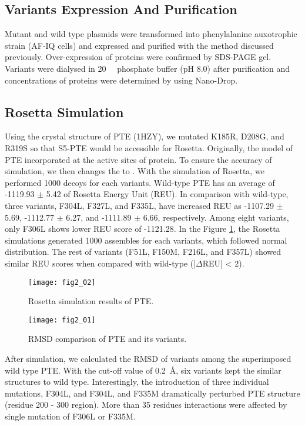 \begin{refsection}
\subsection{Variants Expression And Purification}

Mutant and wild type plasmids were transformed into 
phenylalanine auxotrophic strain (AF-IQ cells) and expressed and purified with
the method discussed  previously.\cite{Yang2014a} Over-expression of proteins
were confirmed by SDS-PAGE gel. Variants were dialysed in \SI{20}{\milli\Molar}
phosphate buffer (pH 8.0) after purification and concentrations of proteins
were determined by using Nano-Drop.

\subsection{Rosetta Simulation}

Using the crystal structure of PTE (1HZY), we mutated K185R, D208G, and R319S
so that S5-PTE would be accessible for Rosetta. Originally, the model of PTE
incorporated  at the active sites of protein. To ensure the accuracy
of simulation, we then changes the  to . With the
simulation of Rosetta, we performed 1000 decoys for each variants.  Wild-type
PTE has an average of -1119.93 $\pm$ 5.42 of Rosetta Energy Unit (REU). In
comparison with wild-type, three variants, F304L, F327L, and F335L, have
increased REU as -1107.29 $\pm$ 5.69, -1112.77 $\pm$ 6.27, and -1111.89 $\pm$
6.66, respectively. Among eight variants, only F306L shows lower REU score of
-1121.28. In the Figure \ref{fig:rosetta-pte-chap2}, the Rosetta simulations
generated 1000 assembles for each variants, which followed normal distribution.
The rest of variants (F51L, F150M, F216L, and F357L) showed similar REU scores
when compared with wild-type (|$\Delta$REU| < 2). 

\begin{figure}[h!] \centering \texttt{[image: fig2\_02]}
    \caption[Rosetta simulation results of PTE.]{Rosetta simulation results of PTE.}
    \label{fig:rosetta-pte-chap2}
\end{figure}
\begin{figure}[h!] \centering \texttt{[image: fig2\_01]}
    \caption[RMSD comparison of PTE and its variants.]{RMSD comparison of PTE
    and its variants.} 
    \label{fig:rmsd-pte-chap2}
\end{figure}
After simulation, we calculated the RMSD of variants among the superimposed
wild type PTE. With the cut-off value of \SI{0.2}{\AA}, six variants kept the
similar structures to wild type. Interestingly, the introduction of three
individual mutations, F304L, and F304L, and F335M dramatically perturbed PTE
structure (residue 200 - 300 region). More than 35 residues interactions were
affected by single mutation of F306L or F335M. 


\end{refsection}
